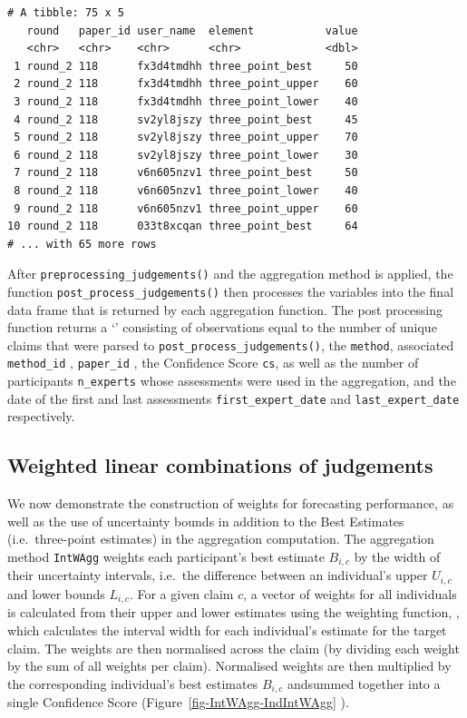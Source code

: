 \documentclass[article]{jss}
\newcommand{\class}[1]{`\code{#1}'}
\newcommand{\fct}[1]{\code{#1()}}
\begin{document}
\begin{tcolorbox}[enhanced jigsaw, colframe=quarto-callout-color-frame, left=2mm, opacityback=0, bottomrule=.15mm, breakable, arc=.35mm, leftrule=.75mm, rightrule=.15mm, toprule=.15mm, colback=white]
\begin{verbatim}
# A tibble: 75 x 5
   round   paper_id user_name  element           value
   <chr>   <chr>    <chr>      <chr>             <dbl>
 1 round_2 118      fx3d4tmdhh three_point_best     50
 2 round_2 118      fx3d4tmdhh three_point_upper    60
 3 round_2 118      fx3d4tmdhh three_point_lower    40
 4 round_2 118      sv2yl8jszy three_point_best     45
 5 round_2 118      sv2yl8jszy three_point_upper    70
 6 round_2 118      sv2yl8jszy three_point_lower    30
 7 round_2 118      v6n605nzv1 three_point_best     50
 8 round_2 118      v6n605nzv1 three_point_lower    40
 9 round_2 118      v6n605nzv1 three_point_upper    60
10 round_2 118      033t8xcqan three_point_best     64
# ... with 65 more rows
\end{verbatim}

After \texttt{preprocessing\_judgements()} and the aggregation method is
applied, the function \texttt{post\_process\_judgements()} then
processes the variables into the final data frame that is returned by
each aggregation function. The post processing function returns a
\class{tibble} consisting of observations equal to the number of unique
claims that were parsed to \texttt{post\_process\_judgements()}, the
\texttt{method}, associated \texttt{method\_id} , \texttt{paper\_id} ,
the Confidence Score \texttt{cs}, as well as the number of participants
\texttt{n\_experts} whose assessments were used in the aggregation, and
the date of the first and last assessments \texttt{first\_expert\_date}
and \texttt{last\_expert\_date} respectively.

\end{tcolorbox}

\hypertarget{sec-IntWAgg}{%
\subsection{Weighted linear combinations of
judgements}\label{sec-IntWAgg}}

We now demonstrate the construction of weights for forecasting
performance, as well as the use of uncertainty bounds in addition to the
Best Estimates (i.e.~three-point estimates) in the aggregation
computation. The aggregation method \texttt{IntWAgg} weights each
participant's best estimate \(B_{i,c}\) by the width of their
uncertainty intervals, i.e.~the difference between an individual's upper
\({U}_{i,c}\) and lower bounds \({L}_{i,c}\). For a given claim \(c\), a
vector of weights for all individuals is calculated from their upper and
lower estimates using the weighting function, \fct{weight\_interval},
which calculates the interval width for each individual's estimate for
the target claim. The weights are then normalised across the claim (by
dividing each weight by the sum of all weights per claim). Normalised
weights are then multiplied by the corresponding individual's best
estimates \(B_{i,c}\) andsummed together into a single Confidence Score
(Figure~\ref{fig-IntWAgg-IndIntWAgg} ).
\end{document}
